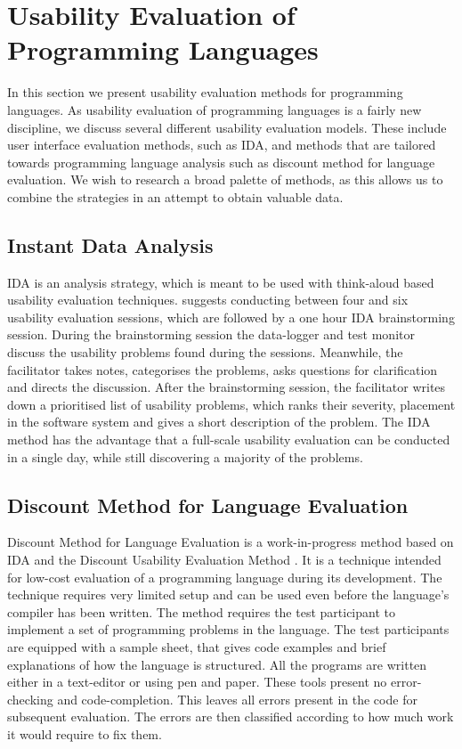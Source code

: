 \section{Usability Evaluation of Programming Languages} \label{sec:prog-usability}
In this section we present usability evaluation methods for programming languages. As usability evaluation of programming languages is a fairly new discipline, we discuss several different usability evaluation models. These include user interface evaluation methods, such as \gls{IDA}, and methods that are tailored towards programming language analysis such as discount method for language evaluation. We wish to research a broad palette of methods, as this allows us to combine the strategies in an attempt to obtain valuable data.

\subsection{Instant Data Analysis} \label{sec:ida}
\gls{IDA} is an analysis strategy, which is meant to be used with think-aloud based usability evaluation techniques\cite{kjeldskov2004instant}. \cite{kjeldskov2004instant} suggests conducting between four and six usability evaluation sessions, which are followed by a one hour \gls{IDA} brainstorming session. During the brainstorming session the data-logger and test monitor discuss the usability problems found during the sessions. Meanwhile, the facilitator takes notes, categorises the problems, asks questions for clarification and directs the discussion. After the brainstorming session, the facilitator writes down a prioritised list of usability problems, which ranks their severity, placement in the software system and gives a short description of the problem. The \gls{IDA} method has the advantage that a full-scale usability evaluation can be conducted in a single day, while still discovering a majority of the problems\cite{kjeldskov2004instant}.

\subsection{Discount Method for Language Evaluation} \label{sec:discount-method}
Discount Method for Language Evaluation is a work-in-progress method based on \gls{IDA}\cite{kurtev2016discount} and the Discount Usability Evaluation Method \cite{benyon2014designing}. It is a technique intended for low-cost evaluation of a programming language during its development. The technique requires very limited setup and can be used even before the language's compiler has been written. The method requires the test participant to implement a set of programming problems in the language. The test participants are equipped with a sample sheet, that gives code examples and brief explanations of how the language is structured. All the programs are written either in a text-editor or using pen and paper. These tools present no error-checking and code-completion. This leaves all errors present in the code for subsequent evaluation. The errors are then classified according to how much work it would require to fix them.

